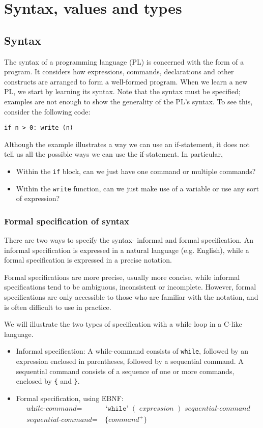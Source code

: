 \documentclass[a4paper, openany]{memoir}
\begin{document}
\chapter{Syntax, values and types}
\section{Syntax}
The syntax of a programming language (PL) is concerned with the form of a program. It considers how expressions, commands, declarations and other constructs are arranged to form a well-formed program. When we learn a new PL, we start by learning its syntax. Note that the syntax must be specified; examples are not enough to show the generality of the PL's syntax. To see this, consider the following code:
\begin{verbatim}
if n > 0: write (n)
\end{verbatim}
Although the example illustrates a way we can use an if-statement, it does not tell us all the possible ways we can use the if-statement. In particular,
\begin{itemize}
    \item Within the \texttt{if} block, can we just have one command or multiple commands?
    \item Within the \texttt{write} function, can we just make use of a variable or use any sort of expression?
\end{itemize}

\subsection{Formal specification of syntax}
There are two ways to specify the syntax- informal and formal specification. An informal specification is expressed in a natural language (e.g. English), while a formal specification is expressed in a precise notation. 

Formal specifications are more precise, usually more concise, while informal specifications tend to be ambiguous, inconsistent or incomplete. However, formal specifications are only accessible to those who are familiar with the notation, and is often difficult to use in practice.

We will illustrate the two types of specification with a while loop in a C-like language.
\begin{itemize}
    \item Informal specification: A while-command consists of \texttt{while}, followed by an expression enclosed in parentheses, followed by a sequential command. A sequential command consists of a sequence of one or more commands, enclosed by \texttt{\{} and \texttt{\}}.
    \item Formal specification, using EBNF:
    \begin{align*}
        \textit{while-command} =& \text{ `}\texttt{while}\text{' }  ( \textit{ expression } )  \textit{ sequential-command} \\
        \textit{sequential-command} =& \ \{ \textit{command}^+ \}
    \end{align*}
\end{itemize}
\end{document}
